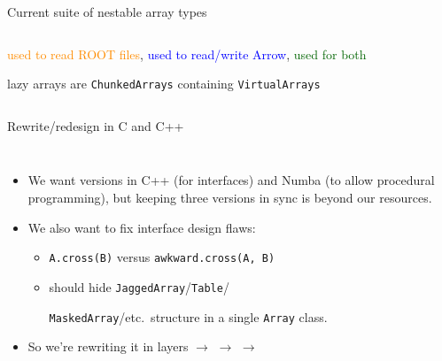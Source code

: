 \documentclass[aspectratio=169]{beamer}
\begin{document}
\begin{frame}{Current suite of nestable array types}
\begin{columns}
\vspace{-0.25 cm}
\begin{center}
\begin{minipage}{0.63\linewidth}
\small
\textcolor{darkorange}{used to read ROOT files}, \textcolor{blue}{used to read/write Arrow}, \textcolor{darkgreen}{used for both}

lazy arrays are \texttt{ChunkedArrays} containing \texttt{VirtualArrays}
\end{minipage}
\end{center}
\end{columns}
\end{frame}

\begin{frame}{Rewrite/redesign in C and C++}
\large
\vspace{0.5 cm}
\begin{columns}
\begin{itemize}\setlength{\itemsep}{0.25 cm}
\item<1-> We want versions in C++ (for interfaces) and Numba (to allow procedural programming), but keeping three versions in sync is beyond our resources.

\item<2-> We also want to fix interface design flaws:
\begin{itemize}\setlength{\itemsep}{0.25 cm}
\item \texttt{A.cross(B)} versus \texttt{awkward.cross(A, B)}
\item should hide \texttt{JaggedArray}/\texttt{Table}/

\texttt{MaskedArray}/etc.\ structure in a single \texttt{Array} class.
\end{itemize}

\item<3-> So we're rewriting it in layers \hfill$\longrightarrow$ $\longrightarrow$ $\longrightarrow$

\vspace{0.5 cm}
\end{itemize}


\end{columns}
\end{frame}
\end{document}
